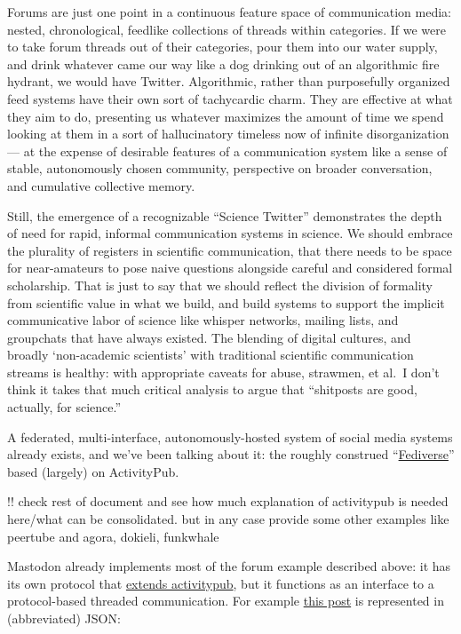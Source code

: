 \documentclass[10pt]{article}
\begin{document}
\begin{multicols}{2}
Forums are just one point in a continuous feature space of communication
media: nested, chronological, feedlike collections of threads within
categories. If we were to take forum threads out of their categories,
pour them into our water supply, and drink whatever came our way like a
dog drinking out of an algorithmic fire hydrant, we would have Twitter.
Algorithmic, rather than purposefully organized feed systems have their
own sort of tachycardic charm. They are effective at what they aim to
do, presenting us whatever maximizes the amount of time we spend looking
at them in a sort of hallucinatory timeless now of infinite
disorganization --- at the expense of desirable features of a
communication system like a sense of stable, autonomously chosen
community, perspective on broader conversation, and cumulative
collective memory.

Still, the emergence of a recognizable ``Science Twitter'' demonstrates
the depth of need for rapid, informal communication systems in science.
We should embrace the plurality of registers in scientific
communication, that there needs to be space for near-amateurs to pose
naive questions alongside careful and considered formal scholarship.
That is just to say that we should reflect the division of formality
from scientific value in what we build, and build systems to support the
implicit communicative labor of science like whisper networks, mailing
lists, and groupchats that have always existed. The blending of digital
cultures, and broadly `non-academic scientists' with traditional
scientific communication streams is healthy: with appropriate caveats
for abuse, strawmen, et al.~I don't think it takes that much critical
analysis to argue that ``shitposts are good, actually, for science.''

A federated, multi-interface, autonomously-hosted system of social media
systems already exists, and we've been talking about it: the roughly
construed ``\href{https://fediverse.party/}{Fediverse}'' based (largely)
on ActivityPub.

!! check rest of document and see how much explanation of activitypub is
needed here/what can be consolidated. but in any case provide some other
examples like peertube and agora, dokieli, funkwhale

Mastodon already implements most of the forum example described above:
it has its own protocol that
\href{https://docs.joinmastodon.org/spec/activitypub/}{extends
activitypub}, but it functions as an interface to a protocol-based
threaded communication. For example
\href{https://social.coop/@jonny/107328829457619549}{this post} is
represented in (abbreviated) JSON:


\end{multicols}
\end{document}
